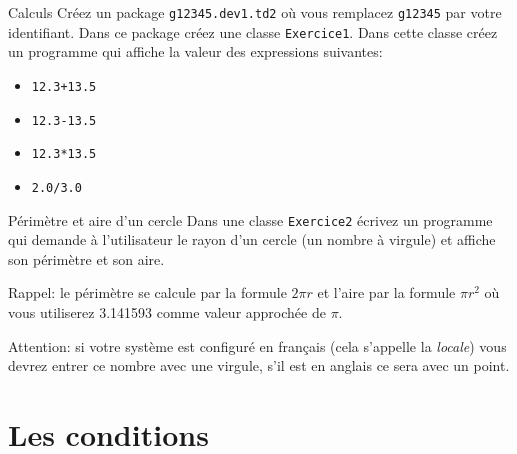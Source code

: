 \documentclass[a4paper,11pt]{article}
\begin{document}

\begin{Exercice}{Calculs}
	Créez un package \texttt{g12345.dev1.td2} où vous remplacez \texttt{g12345} par votre identifiant.
	Dans ce package créez une classe \texttt{Exercice1}.
	Dans cette classe créez un programme qui affiche la valeur des expressions suivantes:
	
	\begin{itemize}		
		\item \texttt{12.3+13.5}
		\item \texttt{12.3-13.5}
		\item \texttt{12.3*13.5}
		\item \texttt{2.0/3.0}
	\end{itemize}
		
\end{Exercice}

\begin{Exercice}{Périmètre et aire d'un cercle}
	Dans une classe \texttt{Exercice2} écrivez un programme
	qui demande à l'utilisateur le rayon d'un cercle (un nombre à virgule)
	et affiche son périmètre et son aire.
	
	Rappel: le périmètre se calcule par la formule $2\pi r$ et 
	l'aire par la formule $\pi r^2$ où vous utiliserez 3.141593 comme valeur approchée de $\pi$.
	
	Attention: si votre système est configuré en français (cela s'appelle la \emph{locale}) 
	vous devrez entrer ce nombre avec une virgule, s'il est en anglais ce sera avec un point.

\end{Exercice}



\section{Les conditions}
\end{document}
